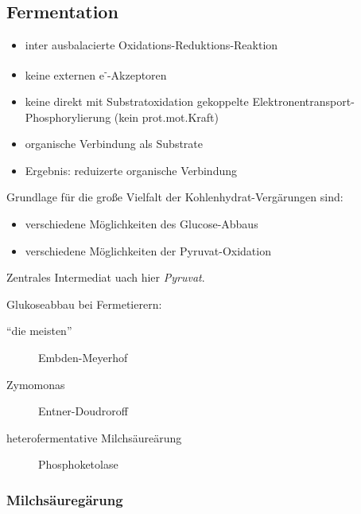 \subsection{Fermentation}
\begin{itemize}
	\item inter ausbalacierte Oxidations-Reduktions-Reaktion
	\item keine externen e\textsuperscript{-}-Akzeptoren
	\item keine direkt mit Substratoxidation gekoppelte Elektronentransport-Phosphorylierung (kein prot.mot.Kraft)
	\item organische Verbindung als Substrate
	\item Ergebnis: reduizerte organische Verbindung
\end{itemize}

Grundlage für die große Vielfalt der Kohlenhydrat-Vergärungen sind:
\begin{itemize}
	\item verschiedene Möglichkeiten des Glucose-Abbaus
	\item verschiedene Möglichkeiten der Pyruvat-Oxidation
\end{itemize}

Zentrales Intermediat uach hier \textsl{Pyruvat}.

Glukoseabbau bei Fermetierern:
\begin{description}
	\item[``die meisten''] Embden-Meyerhof
	\item[Zymomonas]Entner-Doudroroff 
	\item[heterofermentative Milchsäureärung] Phosphoketolase
\end{description}


\subsubsection{Milchsäuregärung}

